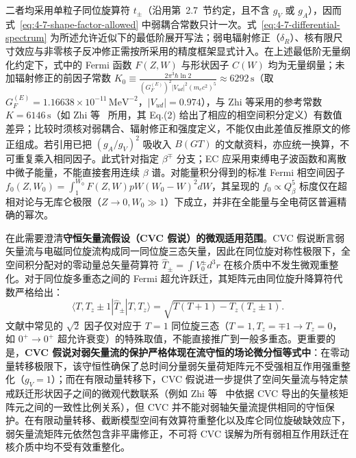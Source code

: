 \begin{itemize}
二者均采用单粒子同位旋算符 $t_\pm$（沿用第~2.7~节约定，且不含 $g_V$ 或 $g_A$），因而式~\eqref{eq:4-7-shape-factor-allowed} 中弱耦合常数只计一次。式~\eqref{eq:4-7-differential-spectrum} 为所述允许近似下的最低阶展开写法；弱电辐射修正（$\delta_R$）、核有限尺寸效应与非零核子反冲修正需按所采用的精度框架显式计入。在上述最低阶无量纲化约定下，式中的 Fermi 函数 $F(Z, W)$ 与形状因子 $C(W)$ 均为无量纲量；未加辐射修正的前因子常数 $K_0 \equiv \frac{2\pi^3 \hbar \ln 2}{(G_F^{(E)})^2 |V_{ud}|^2 (m_e c^2)^5} \approx 6292\,\mathrm{s}$（取 $G_F^{(E)} = 1.16638 \times 10^{-11}\,\mathrm{MeV}^{-2}$，$|V_{ud}| = 0.974$），与 Zhi 等采用的参考常数 $K = 6146\,\mathrm{s}$（如 Zhi 等~\cite{doctoral-r1-g34-zhi-2013-prc-shell-model-half-lives} 所用，其 Eq.(2) 给出了相应的相空间积分定义）有数值差异；比较时须核对弱耦合、辐射修正和强度定义，不能仅由此差值反推原文的修正组成。若引用已把 $(g_A/g_V)^2$ 吸收入 $B(GT)$ 的文献资料，亦应统一换算，不可重复乘入相同因子。此式针对指定 $\beta^\mp$ 分支；EC 应采用束缚电子波函数和离散中微子能量，不能直接套用连续 $\beta$ 谱。对能量积分得到的标准 Fermi 相空间因子 $f_0(Z, W_0) = \int_1^{W_0} F(Z, W) p W (W_0 - W)^2 dW$，其呈现的 $f_0 \propto Q_\beta^5$ 标度仅在超相对论与无库仑极限（$Z \to 0, W_0 \gg 1$）下成立，并非在全能量与全电荷区普遍精确的幂次。
\end{itemize}

在此需要澄清\textbf{守恒矢量流假设（CVC 假说）的微观适用范围}。CVC 假说断言弱矢量流与电磁同位旋流构成同一同位旋三态矢量，因此在同位旋对称性极限下，全空间积分配对的零动量总矢量荷算符 $\hat{T}_\pm = \int V_0^\pm d^3r$ 在核介质中不发生微观重整化。对于同位旋多重态之间的 Fermi 超允许跃迁，其矩阵元由同位旋升降算符代数严格给出：
\begin{equation}\label{eq:4-7-fermi-matrix-element}
\langle T, T_z \pm 1 | \hat{T}_\pm | T, T_z \rangle = \sqrt{T(T+1) - T_z(T_z \pm 1)}.
\end{equation}
文献中常见的 $\sqrt{2}$ 因子仅对应于 $T=1$ 同位旋三态（$T=1, T_z = \mp 1 \to T_z = 0$，如 $0^+ \to 0^+$ 超允许衰变）的特殊取值，不能直接推广到一般多重态。更重要的是，\textbf{CVC 假说对弱矢量流的保护严格体现在流守恒的场论微分恒等式中}：在零动量转移极限下，该守恒性确保了总时间分量弱矢量荷矩阵元不受强相互作用强重整化（$g_V = 1$）；而在有限动量转移下，CVC 假说进一步提供了空间矢量流与特定禁戒跃迁形状因子之间的微观代数联系（例如 Zhi 等~\cite{doctoral-r1-g34-zhi-2013-prc-shell-model-half-lives} 中依据 CVC 导出的矢量核矩阵元之间的一致性比例关系），但 CVC 并不能对弱轴矢量流提供相同的守恒保护。在有限动量转移、截断模型空间有效算符重整化以及库仑同位旋破缺效应下，弱矢量流矩阵元依然包含非平庸修正，不可将 CVC 误解为所有弱相互作用跃迁在核介质中均不受有效重整化。

